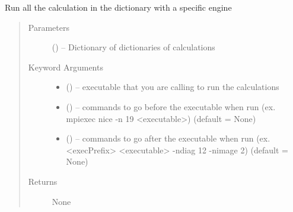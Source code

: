 \documentclass[letterpaper,10pt,english]{sphinxmanual}
\begin{document}
\begin{fulllineitems}
\label{\detokenize{run:run.testOne}}
Run all the calculation in the dictionary with a specific engine
\begin{quote}\begin{description}
\item[{Parameters}] \leavevmode
{} () -- Dictionary of dictionaries of calculations

\item[{Keyword Arguments}] \leavevmode\begin{itemize}
\item {} 
 () -- executable that you are calling to run the calculations

\item {} 
 () -- commands to go before the executable when run
(ex. mpiexec nice -n 19 \textless{}executable\textgreater{}) (default = None)

\item {} 
 () -- commands to go after the executable when run
(ex. \textless{}execPrefix\textgreater{} \textless{}executable\textgreater{} -ndiag 12 -nimage 2) (default = None)

\end{itemize}

\item[{Returns}] \leavevmode
None

\end{description}\end{quote}

\end{fulllineitems}

\end{document}
